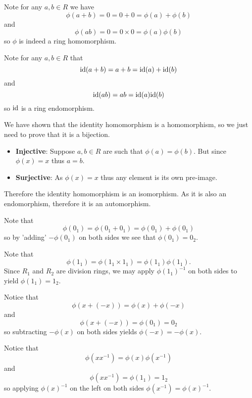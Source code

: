 \begin{questions}
    \item Note for any $a, b \in R$ we have
    \[
        \phi(a+b) = 0 = 0 + 0 = \phi(a) + \phi(b)
    \]
    and
    \[
        \phi(ab) = 0 = 0\times0 = \phi(a)\phi(b)
    \]
    so $\phi$ is indeed a ring homomorphism.

    \item Note for any $a, b \in R$ that
    \[
        \mathrm{id}(a+b) = a + b = \mathrm{id}(a) + \mathrm{id}(b)
    \]
    and
    \[
        \mathrm{id}(ab) = ab = \mathrm{id}(a)\mathrm{id}(b)
    \]
    so $\mathrm{id}$ is a ring endomorphism.

    \item We have shown that the identity homomorphism is a homomorphism, so we just need to prove that it is a bijection.
    \begin{itemize}
        \item \textbf{Injective}: Suppose $a, b \in R$ are such that $\phi(a) = \phi(b)$. But since $\phi(x) = x$ thus $a = b$.
        \item \textbf{Surjective}: As $\phi(x) = x$ thus any element is its own pre-image.
    \end{itemize}
    Therefore the identity homomorphism is an isomorphism. As it is also an endomorphism, therefore it is an automorphism.

    \item \begin{partquestions}{\alph*}
        \item Note that
        \[
            \phi(0_1) = \phi(0_1 + 0_1) = \phi(0_1) + \phi(0_1)
        \]
        so by 'adding' $-\phi(0_1)$ on both sides we see that $\phi(0_1) = 0_2$.

        \item Note that
        \[
            \phi(1_1) = \phi(1_1 \times 1_1) = \phi(1_1)\phi(1_1).
        \]
        Since $R_1$ and $R_2$ are division rings, we may apply $\phi(1_1)^{-1}$ on both sides to yield $\phi(1_1) = 1_2$.
    \end{partquestions}

    \item \begin{partquestions}{\alph*}
        \item Notice that
        \[
            \phi(x + (-x)) = \phi(x) + \phi(-x)
        \]
        and
        \[
            \phi(x + (-x)) = \phi(0_1) = 0_2
        \]
        so subtracting $-\phi(x)$ on both sides yields $\phi(-x) = -\phi(x)$.

        \item Notice that
        \[
            \phi(xx^{-1}) = \phi(x)\phi(x^{-1})
        \]
        and
        \[
            \phi(xx^{-1}) = \phi(1_1) = 1_2
        \]
        so applying $\phi(x)^{-1}$ on the left on both sides $\phi(x^{-1}) = \phi(x)^{-1}$.
    \end{partquestions}


\end{questions}
